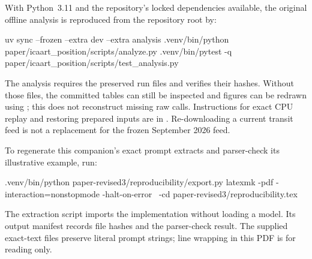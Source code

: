 \documentclass[11pt,a4paper]{scrartcl}
\begin{document}
With Python~3.11 and the repository's locked dependencies available, the original offline analysis is reproduced from the repository root by:
\begin{Code}
uv sync --frozen --extra dev --extra analysis
.venv/bin/python paper/icaart_position/scripts/analyze.py
.venv/bin/pytest -q paper/icaart_position/scripts/test_analysis.py
\end{Code}
The analysis requires the preserved run files and verifies their hashes. Without those files, the committed tables can still be inspected and figures can be redrawn using ; this does not reconstruct missing raw calls. Instructions for exact CPU replay and restoring prepared inputs are in . Re-downloading a current transit feed is not a replacement for the frozen September 2026 feed.

To regenerate this companion's exact prompt extracts and parser-check its illustrative example, run:
\begin{Code}
.venv/bin/python paper-revised3/reproducibility/export.py
latexmk -pdf -interaction=nonstopmode -halt-on-error \
  -cd paper-revised3/reproducibility.tex
\end{Code}
The extraction script imports the implementation without loading a model. Its output manifest records file hashes and the parser-check result. The supplied exact-text files preserve literal prompt strings; line wrapping in this PDF is for reading only.
\end{document}
